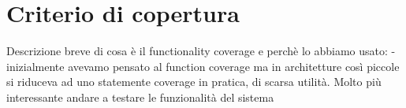\section{Criterio di copertura}

Descrizione breve di cosa è il functionality coverage e perchè lo abbiamo usato:
- inizialmente avevamo pensato al function coverage ma in architetture così piccole si riduceva ad uno statemente coverage in pratica, di scarsa utilità. Molto più interessante andare a testare le funzionalità del sistema